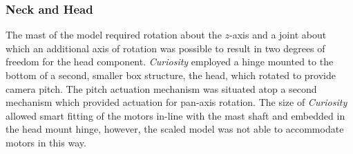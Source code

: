     \subsubsection{Neck and Head}
      The mast of the model required rotation about the $z$-axis and a joint about which an additional axis of rotation was possible to result in two degrees of freedom for the head component. \textit{Curiosity} employed a hinge mounted to the bottom of a second, smaller box structure, the head, which rotated to provide camera pitch. The pitch actuation mechanism was situated atop a second mechanism which provided actuation for pan-axis rotation. The size of \textit{Curiosity} allowed smart fitting of the motors in-line with the mast shaft and embedded in the head mount hinge, however, the scaled model was not able to accommodate motors in this way.
      
